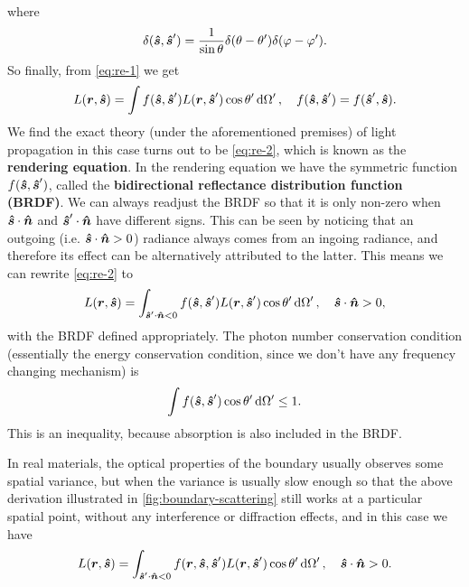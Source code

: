 \documentclass[hyperref, a4paper]{article}
\newcommand*{\concept}[1]{{\textbf{#1}}}
\begin{document}
where 
\begin{equation}
    \delta(\vu*{s}, \vu*{s}') = \frac{1}{\sin \theta} \delta(\theta - \theta') \delta(\varphi - \varphi'). 
\end{equation}
So finally, from \eqref{eq:re-1} we get 
\begin{equation}
    L(\vb*{r}, \vu*{s}) = \int f(\vu*{s}, \vu*{s}') L(\vb*{r}, \vu*{s}') \cos \theta' \dd{\Omega'}, 
    \quad f(\vu*{s}, \vu*{s}') = f(\vu*{s}', \vu*{s}).
    \label{eq:re-2}
\end{equation}
We find the exact theory (under the aforementioned premises) of light propagation 
in this case turns out to be \eqref{eq:re-2},
which is known as the \concept{rendering equation}. 
In the rendering equation we have the symmetric function $f(\vu*{s}, \vu*{s}')$,
called the \concept{bidirectional reflectance distribution function (BRDF)}. 
We can always readjust the BRDF so that it is only non-zero 
when $\vu*{s} \cdot \vu*{n}$ and $\vu*{s}' \cdot \vu*{n}$
have different signs. 
This can be seen by noticing that an outgoing (i.e. $\vu*{s} \cdot \vu*{n} > 0$) radiance 
always comes from an ingoing radiance, 
and therefore its effect can be alternatively attributed to the latter. 
This means we can rewrite \eqref{eq:re-2} to
\begin{equation}
    L(\vb*{r}, \vu*{s}) = \int_{\vu*{s}' \cdot \vu*{n} < 0} 
    f(\vu*{s}, \vu*{s}') L(\vb*{r}, \vu*{s}') \cos \theta' \dd{\Omega'}, \quad 
    \vu*{s} \cdot \vu*{n} > 0,
\end{equation}
with the BRDF defined appropriately.
The photon number conservation condition (essentially the energy conservation condition, 
since we don't have any frequency changing mechanism) is 
\begin{equation}
    \int f(\vu*{s}, \vu*{s}') \cos \theta' \dd{\Omega'}  \leq 1.
\end{equation}
This is an inequality, because absorption is also included in the BRDF.

In real materials, the optical properties of the boundary 
usually observes some spatial variance,
but when the variance is usually slow enough so that 
the above derivation illustrated in \eqref{fig:boundary-scattering} still works  
at a particular spatial point, 
without any interference or diffraction effects, 
and in this case we have 
\begin{equation}
    L(\vb*{r}, \vu*{s}) = \int_{\vu*{s}' \cdot \vu*{n} < 0} 
    f(\vb*{r}, \vu*{s}, \vu*{s}') L(\vb*{r}, \vu*{s}') \cos \theta' \dd{\Omega'}, \quad 
    \vu*{s} \cdot \vu*{n} > 0.
    \label{eq:re-final}
\end{equation}
\end{document}

